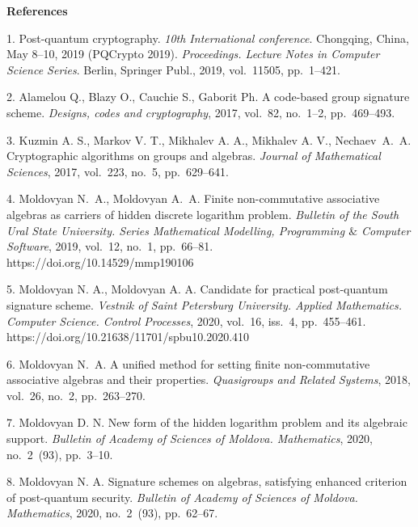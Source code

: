

{\small



\vskip6mm

\noindent \textbf{References} }

\vskip 2mm

{\footnotesize



1.\,\,Post-quantum cryptography. {\it 10th International conference}. Chongqing, China, May 8--10, 2019 (PQCrypto 2019). {\it Proceedings.  Lecture Notes in Computer Science Series}.
Berlin, Springer Publ., 2019, vol.~11505, pp.~1--421.

2.\,\,Alamelou Q., Blazy O., Cauchie S., Gaborit Ph.
A code-based group signature scheme. {\it Designs, codes and cryptography}, 2017, vol.~82, no.~1--2, pp.~469--493.

3.\,\,Kuzmin A. S., Markov V. T., Mikhalev A. A., Mikhalev A. V., Ne\-chaev~A.~A. Cryptographic algorithms on groups and algebras.
{\it Journal of Mathematical Sciences}, 2017, vol.~223, no.~5, pp.~629--641.

4.\,\,Moldovyan N.~A., Moldovyan A.~A. Finite non-commutative associative algebras as car\-riers of hidden discrete logarithm problem. {\it Bulletin of the South Ural State University. Series Ma\-the\-ma\-ti\-cal Modelling, Programming $\&$ Computer Software}, 2019, vol.~12, no.~1, pp.~66--81.\\ https://doi.org/10.14529/mmp190106

5.\,\,Moldovyan N. A., Moldovyan A. A. Candidate for practical post-quantum signature scheme.
{\it Vestnik of Saint Petersburg University. Applied Mathematics.
Computer Science. Control Processes}, 2020, vol.~16, iss.~4, pp.~455--461. https://doi.org/10.21638/11701/spbu10.2020.410

6.\,\,Moldovyan N.~A. A unified method for setting finite non-commutative associative algebras and their properties. {\it Quasigroups and Related Systems}, 2018, vol.~26, no.~2, pp.~263--270.

7.\,\,Moldovyan D. N. New form of the hidden logarithm problem and its algebraic support. {\it  Bulletin of Academy of Sciences of Moldova. Mathematics}, 2020, no.~2~(93),
pp.~3--10.

8.\,\,Moldovyan N. A. Signature schemes on algebras,
satisfying enhanced criterion of post-quantum security. {\it Bulletin of Academy of Sciences of Moldova. Mathematics}, 2020, no.~2~(93),
pp.~62--67.

}
